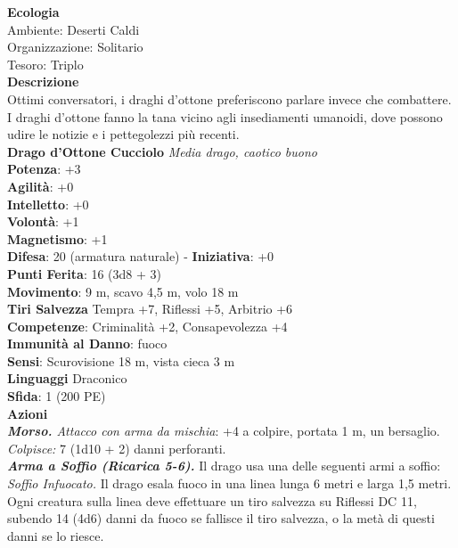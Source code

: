 \begin{multicols}{2}
\textbf{Ecologia}\\
Ambiente: Deserti Caldi\\
Organizzazione: Solitario\\
Tesoro: Triplo\\
\textbf{Descrizione}\\
Ottimi conversatori, i draghi d’ottone preferiscono parlare invece che combattere. I draghi d’ottone fanno la tana vicino agli insediamenti umanoidi, dove possono udire le notizie e i pettegolezzi più recenti.\\


\medskip\textbf{Drago d'Ottone Cucciolo}
\emph{Media drago, caotico buono}\\
\textbf{Potenza}: +3\\
\textbf{Agilità}: +0\\
\textbf{Intelletto}: +0\\
\textbf{Volontà}: +1\\
\textbf{Magnetismo}: +1\\
\textbf{Difesa}: 20 (armatura naturale) - \textbf{Iniziativa}: +0\\
\textbf{Punti Ferita}: 16 (3d8 + 3)\\
\textbf{Movimento}: 9 m, scavo 4,5 m, volo 18 m\\
\textbf{Tiri Salvezza} Tempra +7, Riflessi +5, Arbitrio +6\\
\textbf{Competenze}: Criminalità +2, Consapevolezza +4\\
\textbf{Immunità al Danno}: fuoco\\
\textbf{Sensi}: Scurovisione 18 m, vista cieca 3 m\\
\textbf{Linguaggi} Draconico\\
\textbf{Sfida}: 1 (200 PE)\smallskip\\
\smallskip\textbf{Azioni}\\
\emph{\textbf{Morso.} Attacco con arma da mischia}: +4 a colpire, portata 1 m, un bersaglio.\\
\emph{Colpisce:} 7 (1d10 + 2) danni perforanti.\\
\emph{\textbf{Arma a Soffio (Ricarica 5-6).}} Il drago usa una delle seguenti armi a soffio:\\
\emph{Soffio Infuocato.} Il drago esala fuoco in una linea lunga 6 metri e larga 1,5 metri. Ogni creatura sulla linea deve effettuare un tiro salvezza su Riflessi DC 11, subendo 14 (4d6) danni da fuoco se fallisce il tiro salvezza, o la metà di questi danni se lo riesce.\\

\end{multicols}
